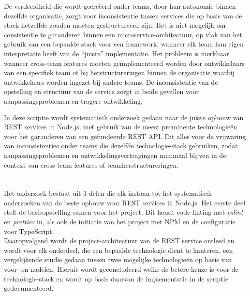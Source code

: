De verdeeldheid die wordt gecreëerd onder teams, door hun autonomie binnen dezelfde organisatie, zorgt voor inconsistentie tussen services die op basis van de stack hetzelfde zouden moeten gestructureerd zijn. Het is niet mogelijk om consistentie te garanderen binnen een microservice-architectuur, op vlak van het gebruik van een bepaalde stack voor een framework, wanneer elk team hun eigen interpretatie heeft van de ``juiste'' implementatie. Het probleem is merkbaar wanneer cross-team features moeten geïmplementeerd worden door ontwikkelaars van een specifiek team of bij herstructureringen binnen de organisatie waarbij ontwikkelaars worden ingezet bij andere teams. De inconsistentie van de opstelling en structuur van de service zorgt in beide gevallen voor aanpassingsproblemen en tragere ontwikkeling.

In deze scriptie wordt systematisch onderzoek gedaan naar de juiste opbouw van \gls{REST} services in Node.js, met gebruik van de meest prominente technologieën voor het garanderen van een gefundeerde \gls{REST} \gls{API}. Dit alles voor de vrijwaring van inconsistenties onder teams die dezelfde technologie-stack gebruiken, zodat aanpassingsproblemen en ontwikkelingsvertragingen minimaal blijven in de context van cross-team features of teamherstructureringen.

\section{}
\label{sec:plan-van-aanpak}


Het onderzoek bestaat uit 3 delen die elk instaan tot het systematisch onderzoeken van de beste opbouw voor \gls{REST} services in Node.js. Het eerste deel stelt de basisopstelling samen voor het project. Dit houdt code-linting met \emph{eslint} en \emph{prettier} in, als ook de initiatie van het project met \gls{NPM} en de configuratie voor TypeScript. \\
Daaropvolgend wordt de project-architectuur van de \gls{REST} service ontleed en wordt voor elk onderdeel, die een bepaalde technologie dient te hanteren, een vergelijkende studie gedaan tussen twee mogelijke technologieën op basis van voor- en nadelen. Hieruit wordt geconcludeerd welke de betere keuze is voor de technologie-stack en wordt op basis daarvan de implementatie in de scriptie gedocumenteerd. \\

